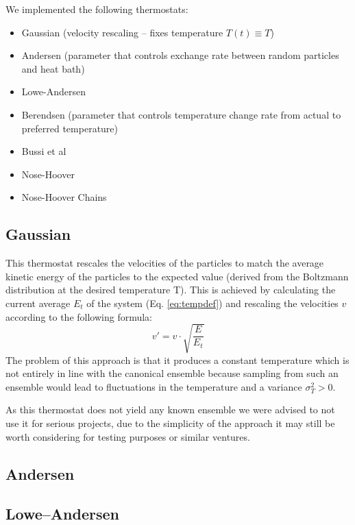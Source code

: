\TODO[introtext]
We implemented the following thermostats: %
\begin{itemize}
\item Gaussian (velocity rescaling -- fixes temperature $T(t) \equiv T$)
\item Andersen (parameter that controls exchange rate between random particles and heat bath)
\item Lowe-Andersen
\item Berendsen (parameter that controls temperature change rate from actual to preferred temperature)
\item Bussi et al
\item Nose-Hoover
\item Nose-Hoover Chains
\end{itemize}

\subsection{Gaussian}
This thermostat rescales the velocities of the particles to match the average kinetic energy of the particles to the expected value (derived from the Boltzmann distribution at the desired temperature T). This is achieved by calculating the current average $E_t$ of the system (Eq. \eqref{eq:tempdef}) and rescaling the velocities $v$ according to the following formula:
\begin{equation*}
v'  = v\cdot \sqrt{\frac{E}{E_t}}
\end{equation*}
The problem of this approach is that it produces a constant temperature which is not entirely in line with the canonical ensemble because sampling from such an ensemble would lead to fluctuations in the temperature and a variance $\sigma_T^2 > 0$.

As this thermostat does not yield any known ensemble we were advised to not use it for serious projects, due to the simplicity of the approach it may still be worth considering for testing purposes or similar ventures.


\subsection{Andersen}
\subsection{Lowe--Andersen}
